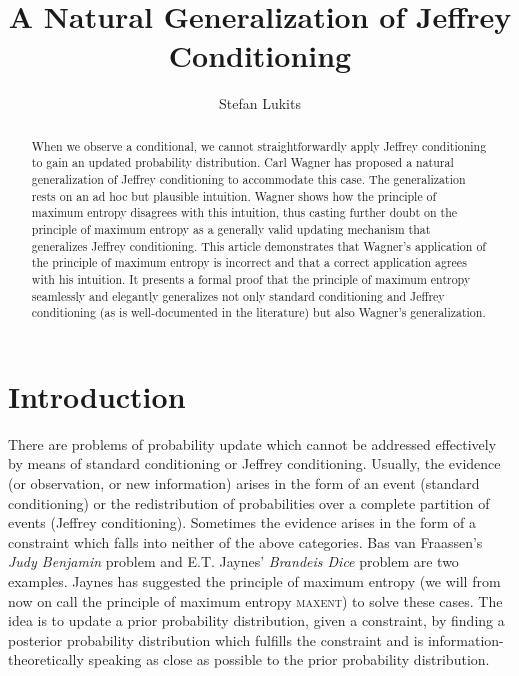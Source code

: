 \documentclass[11pt]{article}
\begin{document}

\title{A Natural Generalization of Jeffrey Conditioning}
\author{Stefan Lukits}

\date{}

\maketitle


\begin{abstract} 
  {\noindent}When we observe a conditional, we cannot
  straightforwardly apply Jeffrey conditioning to gain an updated
  probability distribution. Carl Wagner has proposed a natural
  generalization of Jeffrey conditioning to accommodate this case. The
  generalization rests on an ad hoc but plausible intuition. Wagner
  shows how the principle of maximum entropy disagrees with this
  intuition, thus casting further doubt on the principle of maximum
  entropy as a generally valid updating mechanism that generalizes
  Jeffrey conditioning. This article demonstrates that Wagner's
  application of the principle of maximum entropy is incorrect and
  that a correct application agrees with his intuition. It presents a
  formal proof that the principle of maximum entropy seamlessly and
  elegantly generalizes not only standard conditioning and Jeffrey
  conditioning (as is well-documented in the literature) but also
  Wagner's generalization.
\end{abstract}

\section{Introduction}
\label{Introduction}

There are problems of probability update which cannot be addressed
effectively by means of standard conditioning or Jeffrey conditioning.
Usually, the evidence (or observation, or new information) arises in
the form of an event (standard conditioning) or the redistribution of
probabilities over a complete partition of events (Jeffrey
conditioning). Sometimes the evidence arises in the form of a
constraint which falls into neither of the above categories. Bas van
Fraassen's \emph{Judy Benjamin} problem and E.T. Jaynes'
\emph{Brandeis Dice} problem are two examples. Jaynes has suggested
the principle of maximum entropy (we will from now on call the
principle of maximum entropy \textsc{maxent}) to solve these cases.
The idea is to update a prior probability distribution, given a
constraint, by finding a posterior probability distribution which
fulfills the constraint and is information-theoretically speaking as
close as possible to the prior probability distribution.
\end{document}
